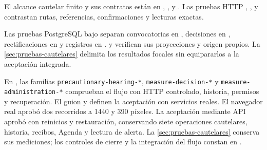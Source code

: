 {\raggedright El alcance cautelar finito y sus contratos est\'an en , ,  y . Las pruebas HTTP , ,  y  contrastan rutas, referencias, confirmaciones y lecturas exactas.\par}

{\raggedright Las pruebas PostgreSQL bajo  separan convocatorias en , decisiones en , rectificaciones en  y registros en .  y  verifican sus proyecciones y origen propios. La \cref{sec:pruebas-cautelares} delimita los resultados focales sin equipararlos a la aceptaci\'on integrada.\par}

{\raggedright En , las familias \texttt{precautionary-hearing-*}, \texttt{measure-decision-*} y \texttt{measure-administration-*} comprueban el flujo con HTTP controlado, historia, permisos y recuperaci\'on. El guion  y  definen la aceptaci\'on con servicios reales. El navegador real aprob\'o dos recorridos a 1440 y 390 p\'ixeles. La aceptaci\'on mediante API aprob\'o con reinicios y restauraci\'on, conservando siete operaciones cautelares, historia, recibos, Agenda y lectura de alerta. La \cref{sec:pruebas-cautelares} conserva sus mediciones; los controles de cierre y la integraci\'on del flujo constan en .\par}
